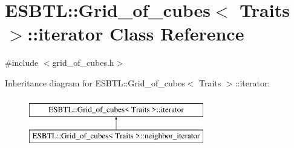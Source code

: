 \hypertarget{classESBTL_1_1Grid__of__cubes_1_1iterator}{}\section{E\+S\+B\+TL\+:\+:Grid\+\_\+of\+\_\+cubes$<$ Traits $>$\+:\+:iterator Class Reference}
\label{classESBTL_1_1Grid__of__cubes_1_1iterator}


{\ttfamily \#include $<$grid\+\_\+of\+\_\+cubes.\+h$>$}

Inheritance diagram for E\+S\+B\+TL\+:\+:Grid\+\_\+of\+\_\+cubes$<$ Traits $>$\+:\+:iterator\+:\begin{figure}[H]
\begin{center}
\leavevmode
\includegraphics[height=2.000000cm]{classESBTL_1_1Grid__of__cubes_1_1iterator}
\end{center}
\end{figure}
